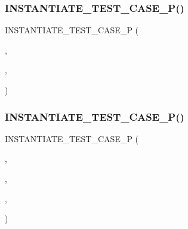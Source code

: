\subsubsection{\texorpdfstring{INSTANTIATE\_TEST\_CASE\_P()}{INSTANTIATE\_TEST\_CASE\_P()}\hspace{0.1cm}{\footnotesize\ttfamily [1/2]}}
{\footnotesize\ttfamily I\+N\+S\+T\+A\+N\+T\+I\+A\+T\+E\+\_\+\+T\+E\+S\+T\+\_\+\+C\+A\+S\+E\+\_\+P (\begin{DoxyParamCaption}\item[{Printing\+Failing\+Params}]{,  }\item[{\mbox{\hyperlink{class_failing_param_test}{Failing\+Param\+Test}}}]{,  }\item[{\mbox{\hyperlink{namespacetesting_abd3c87b40c2a0663691c9b617ed5fcc2}{testing\+::\+Values}}(2)}]{ }\end{DoxyParamCaption})}

\mbox{\label{_obj__test_2lib_2googletest-release-1_88_81_2googletest_2test_2googletest-output-test___8cc_a00b51dcd9ffaced8ceefcc4caf87c334}} 
\subsubsection{\texorpdfstring{INSTANTIATE\_TEST\_CASE\_P()}{INSTANTIATE\_TEST\_CASE\_P()}\hspace{0.1cm}{\footnotesize\ttfamily [2/2]}}
{\footnotesize\ttfamily I\+N\+S\+T\+A\+N\+T\+I\+A\+T\+E\+\_\+\+T\+E\+S\+T\+\_\+\+C\+A\+S\+E\+\_\+P (\begin{DoxyParamCaption}\item[{Printing\+Strings}]{,  }\item[{\mbox{\hyperlink{class_param_test}{Param\+Test}}}]{,  }\item[{\mbox{\hyperlink{namespacetesting_abd3c87b40c2a0663691c9b617ed5fcc2}{testing\+::\+Values}}(std\+::string(\char`\"{}a\char`\"{}))}]{,  }\item[{\mbox{\hyperlink{_obj__test_2lib_2googletest-release-1_88_81_2googletest_2test_2googletest-output-test___8cc_a61c686cb1c0f8f19c100ff975482ec7a}{Param\+Name\+Func}}}]{ }\end{DoxyParamCaption})}

